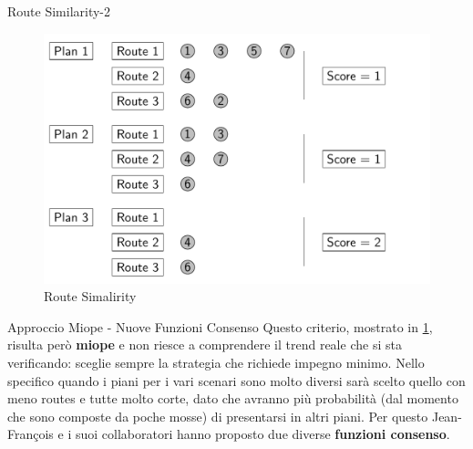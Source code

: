 \documentclass[10pt]{beamer}
\begin{document}
    \begin{frame}{Route Similarity-2}
        \begin{figure}
            \centering
            \includegraphics[scale=0.22]{Images/RouteSimilarity.png}
            \caption{Route Simalirity}
            \label{fig:RouteSimilarity}
        \end{figure}
    \end{frame} 

    \begin{frame}{Approccio Miope - Nuove Funzioni Consenso}
        Questo criterio, mostrato in \ref{fig:RouteSimilarity}, risulta però \textbf{miope} e non riesce a comprendere il trend reale che si sta verificando: sceglie sempre la strategia che richiede impegno minimo. Nello specifico quando i piani per i vari scenari sono molto diversi sarà scelto quello con meno routes e tutte molto corte, dato che avranno più probabilità (dal momento che sono composte da poche mosse) di presentarsi in altri piani. Per questo Jean-François e i suoi collaboratori hanno proposto due diverse \textbf{funzioni consenso}.
    \end{frame}
\end{document}
